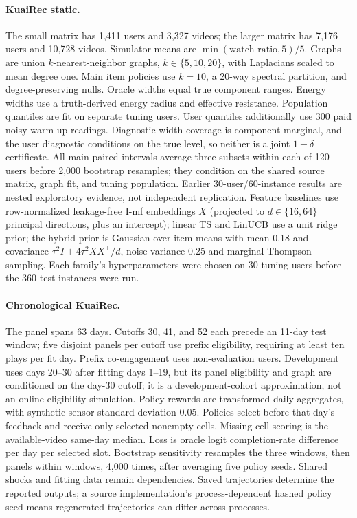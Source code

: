 \documentclass[sigconf,review,anonymous]{acmart}
\begin{document}
\paragraph{KuaiRec static.} The small matrix has 1,411 users and 3,327 videos; the larger matrix has 7,176 users and 10,728 videos. Simulator means are $\min(\text{watch ratio},5)/5$. Graphs are union $k$-nearest-neighbor graphs, $k\in\{5,10,20\}$, with Laplacians scaled to mean degree one. Main item policies use $k=10$, a 20-way spectral partition, and degree-preserving nulls. Oracle widths equal true component ranges. Energy widths use a truth-derived energy radius and effective resistance. Population quantiles are fit on separate tuning users. User quantiles additionally use 300 paid noisy warm-up readings. Diagnostic width coverage is component-marginal, and the user diagnostic conditions on the true level, so neither is a joint $1-\delta$ certificate. All main paired intervals average three subsets within each of 120 users before 2,000 bootstrap resamples; they condition on the shared source matrix, graph fit, and tuning population. Earlier 30-user/60-instance results are nested exploratory evidence, not independent replication. Feature baselines use row-normalized leakage-free I-mf embeddings $X$ (projected to $d\in\{16,64\}$ principal directions, plus an intercept); linear TS and LinUCB use a unit ridge prior; the hybrid prior is Gaussian over item means with mean 0.18 and covariance $\tau^2I+4\tau^2XX^\top/d$, noise variance 0.25 and marginal Thompson sampling. Each family's hyperparameters were chosen on 30 tuning users before the 360 test instances were run.

\paragraph{Chronological KuaiRec.} The panel spans 63 days. Cutoffs 30, 41, and 52 each precede an 11-day test window; five disjoint panels per cutoff use prefix eligibility, requiring at least ten plays per fit day. Prefix co-engagement uses non-evaluation users. Development uses days 20--30 after fitting days 1--19, but its panel eligibility and graph are conditioned on the day-30 cutoff; it is a development-cohort approximation, not an online eligibility simulation. Policy rewards are transformed daily aggregates, with synthetic sensor standard deviation 0.05. Policies select before that day's feedback and receive only selected nonempty cells. Missing-cell scoring is the available-video same-day median. Loss is oracle logit completion-rate difference per day per selected slot. Bootstrap sensitivity resamples the three windows, then panels within windows, 4,000 times, after averaging five policy seeds. Shared shocks and fitting data remain dependencies. Saved trajectories determine the reported outputs; a source implementation's process-dependent hashed policy seed means regenerated trajectories can differ across processes.
\end{document}
